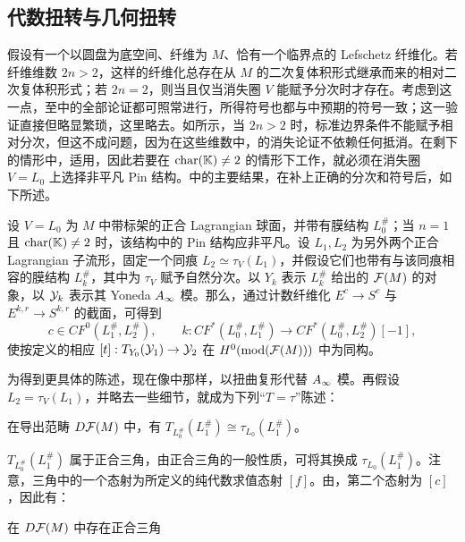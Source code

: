 \subsection{代数扭转与几何扭转}\label{sec:17j}
假设有一个以圆盘为底空间、纤维为 $M$、恰有一个临界点的 Lefschetz 纤维化。若纤维维数 $2n>2$，这样的纤维化总存在从 $M$ 的二次复体积形式继承而来的相对二次复体积形式；若 $2n=2$，则当且仅当消失圈 $V$ 能赋予分次时才存在。考虑到这一点，至中的全部论证都可照常进行，所得符号也都与中预期的符号一致；这一验证直接但略显繁琐，这里略去。如所示，当 $2n>2$ 时，标准边界条件不能赋予相对分次，但这不成问题，因为在这些维数中，的消失论证不依赖任何抵消。在剩下的情形中，适用，因此若要在 $\operatorname{char}(\mathbb K)\ne2$ 的情形下工作，就必须在消失圈 $V=L_0$ 上选择非平凡 Pin 结构。中的主要结果，在补上正确的分次和符号后，如下所述。

\begin{theorem}\label{st:17.16}
设 $V=L_0$ 为 $M$ 中带标架的正合 Lagrangian 球面，并带有膜结构 $L_0^\#$；当 $n=1$ 且 $\operatorname{char}(\mathbb K)\ne2$ 时，该结构中的 Pin 结构应非平凡。设 $L_1,L_2$ 为另外两个正合 Lagrangian 子流形，固定一个同痕 $L_2\simeq\tau_V(L_1)$，并假设它们也带有与该同痕相容的膜结构 $L_k^\#$，其中为 $\tau_V$ 赋予自然分次。以 $Y_k$ 表示 $L_k^\#$ 给出的 $\mathcal F(M)$ 的对象，以 $\mathcal Y_k$ 表示其 Yoneda $A_\infty$ 模。那么，通过计数纤维化 $E^c\to S^c$ 与 $E^{k,r}\to S^{k,r}$ 的截面，可得到
\[
c\in CF^0(L_1^\#,L_2^\#),\qquad
k:CF^*(L_0^\#,L_1^\#)\longrightarrow CF^*(L_0^\#,L_2^\#)[-1],
\]
使按定义的相应 $[t]:T_{Y_0}(\mathcal Y_1)\to\mathcal Y_2$ 在 $H^0(\operatorname{mod}(\mathcal F(M)))$ 中为同构。
\end{theorem}

为得到更具体的陈述，现在像中那样，以扭曲复形代替 $A_\infty$ 模。再假设 $L_2=\tau_V(L_1)$，并略去一些细节，就成为下列“$T=\tau$”陈述：
\begin{corollary}\label{st:17.17}
在导出范畴 $D\mathcal F(M)$ 中，有 $T_{L_0^\#}(L_1^\#)\cong\tau_{L_0}(L_1^\#)$。
\end{corollary}
$T_{L_0^\#}(L_1^\#)$ 属于正合三角，由正合三角的一般性质，可将其换成 $\tau_{L_0}(L_1^\#)$。注意，三角中的一个态射为所定义的纯代数求值态射 $[f]$。由，第二个态射为 $[c]$，因此有：
\clearpage
\enlargethispage{\baselineskip}
\begin{corollary}\label{st:17.18}
在 $D\mathcal F(M)$ 中存在正合三角
\end{corollary}

